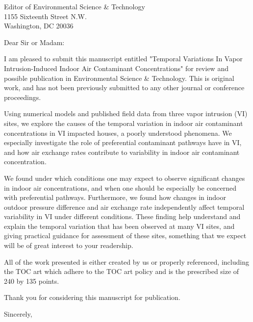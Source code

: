 \documentclass{letter}
\begin{document}
\begin{letter}{Editor of Environmental Science \& Technology \\
1155 Sixteenth Street N.W. \\
Washington, DC 20036}
\opening{Dear Sir or Madam:}

I am pleased to submit this manuscript entitled "Temporal Variations In Vapor Intrusion-Induced Indoor Air Contaminant Concentrations" for review and possible publication in Environmental Science \& Technology.
This is original work, and has not been previously submitted to any other journal or conference proceedings.

Using numerical models and published field data from three vapor intrusion (VI) sites, we explore the causes of the temporal variation in indoor air contaminant concentrations in VI impacted houses, a poorly understood phenomena.
We especially investigate the role of preferential contaminant pathways have in VI, and how air exchange rates contribute to variability in indoor air contaminant concentration.

We found under which conditions one may expect to observe significant changes in indoor air concentrations, and when one should be especially be concerned with preferential pathways.
Furthermore, we found how changes in indoor outdoor pressure difference and air exchange rate independently affect temporal variability in VI under different conditions. 
These finding help understand and explain the temporal variation that has been observed at many VI sites, and giving practical guidance for assessment of these sites, something that we expect will be of great interest to your readership.

All of the work presented is either created by us or properly referenced, including the TOC art which adhere to the TOC art policy and is the prescribed size of 240 by 135 points.

Thank you for considering this manuscript for publication.
\closing{Sincerely,}

\end{letter}
\end{document}
